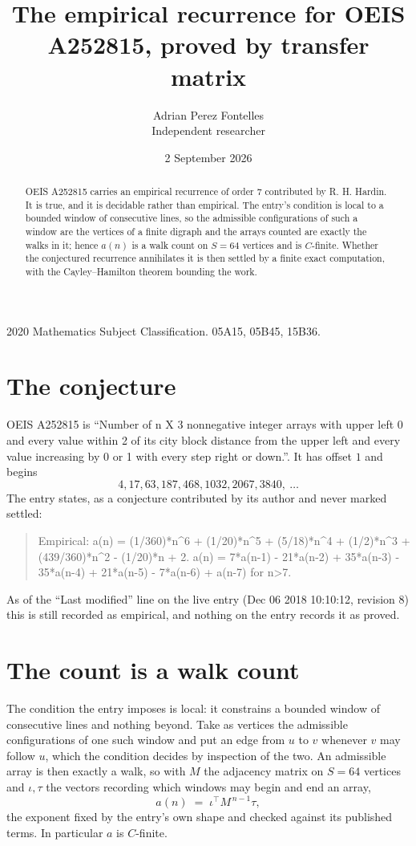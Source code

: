 \documentclass[11pt,a4paper]{article}
\title{The empirical recurrence for OEIS A252815, proved by transfer matrix}
\author{Adrian Perez Fontelles\\ \small Independent researcher}
\date{2 September 2026}
\theoremstyle{plain}
\theoremstyle{definition}
\begin{document}
\maketitle

\begin{abstract}
OEIS A252815 carries an empirical recurrence of order $7$ contributed by R. H. Hardin. It is
true, and it is decidable rather than empirical. The entry's condition is local to a bounded window of consecutive lines, so
the admissible configurations of such a window are the vertices of a finite digraph and the
arrays counted are exactly the walks in it; hence $a(n)$ is a walk count on $S=64$ vertices
and is $C$-finite. Whether the conjectured recurrence annihilates it is then settled by a
finite exact computation, with the Cayley--Hamilton theorem bounding the work.
\end{abstract}

\noindent\small 2020 Mathematics Subject Classification. 05A15, 05B45, 15B36.\normalsize

\section{The conjecture}

OEIS A252815 is ``Number of n X 3 nonnegative integer arrays with upper left 0 and every value within 2 of its city block distance from the upper left and every value increasing by 0 or 1 with every step right or down.''. It has offset $1$ and begins
\[
4, 17, 63, 187, 468, 1032, 2067, 3840,\ \dots
\]
The entry states, as a conjecture contributed by its author and never marked settled:
\begin{quote}
Empirical: a(n) = (1/360)*n\^{}6 + (1/20)*n\^{}5 + (5/18)*n\^{}4 + (1/2)*n\^{}3 + (439/360)*n\^{}2 - (1/20)*n + 2. a(n) = 7*a(n-1) - 21*a(n-2) + 35*a(n-3) - 35*a(n-4) + 21*a(n-5) - 7*a(n-6) + a(n-7) for n>7.
\end{quote}
As of the ``Last modified'' line on the live entry (Dec 06 2018 10:10:12, revision 8) this is still
recorded as empirical, and nothing on the entry records it as proved.

\section{The count is a walk count}

The condition the entry imposes is local: it constrains a bounded window of consecutive lines and nothing beyond. Take as
vertices the admissible configurations of one such window and put an edge from $u$ to $v$
whenever $v$ may follow $u$, which the condition decides by inspection of the two. An
admissible array is then exactly a walk, so with $M$ the adjacency matrix on $S=64$ vertices
and $\iota,\tau$ the vectors recording which windows may begin and end an array,
\[
a(n)\;=\;\iota^{\!\top}M^{\,n-1}\tau ,
\]
the exponent fixed by the entry's own shape and checked against its published terms. In
particular $a$ is $C$-finite.
\end{document}
